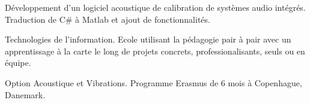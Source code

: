\documentclass[10pt,a4paper]{altacv}
\begin{document}
D\'eveloppement d'un logiciel acoustique de calibration de syst\`emes audio int\'egr\'es. Traduction de C\# \`a
Matlab et ajout de fonctionnalit\'es.


Technologies de l'information.\linebreak
Ecole utilisant la p\'edagogie pair \`a pair avec un apprentissage \`a la carte le long de projets concrets, professionalisants, seuls ou en \'equipe.
\divider

Option Acoustique et Vibrations.\linebreak
Programme Erasmus de 6 mois \`a Copenhague, Danemark.

\clearpage
\end{document}
